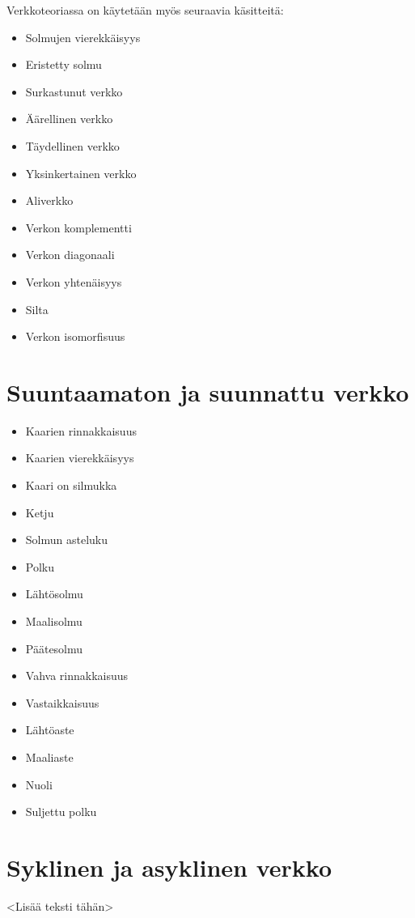 Verkkoteoriassa on käytetään myös seuraavia käsitteitä:
\begin{itemize}
  \item Solmujen vierekkäisyys
  \item Eristetty solmu
  \item Surkastunut verkko
  \item Äärellinen verkko
  \item Täydellinen verkko
  \item Yksinkertainen verkko
  \item Aliverkko
  \item Verkon komplementti
  \item Verkon diagonaali
  \item Verkon yhtenäisyys
  \item Silta
  \item Verkon isomorfisuus
\end{itemize}

\section{Suuntaamaton ja suunnattu verkko}

\begin{itemize}
  \item Kaarien rinnakkaisuus
  \item Kaarien vierekkäisyys
  \item Kaari on silmukka
  \item Ketju
  \item Solmun asteluku
  \item Polku
  \item Lähtösolmu
  \item Maalisolmu
  \item Päätesolmu
  \item Vahva rinnakkaisuus
  \item Vastaikkaisuus
  \item Lähtöaste
  \item Maaliaste
  \item Nuoli
  \item Suljettu polku
\end{itemize}

\section{Syklinen ja asyklinen verkko}

<Lisää teksti tähän>

